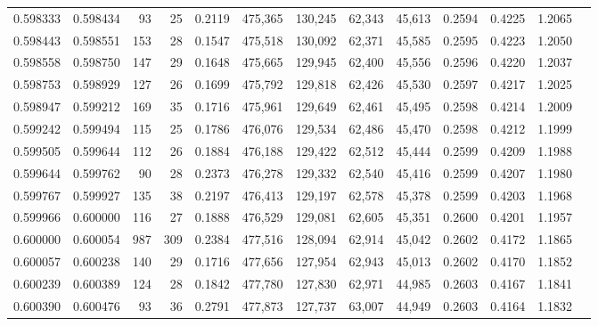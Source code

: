 \begin{tabular}{rrrrrrrrrrrrr}
0.598333 & 0.598434 &     93 &    25 &                                     0.2119 & 475,365 & 130,245 &  62,343 &  45,613 & 0.2594 & 0.4225 & 1.2065 \\
0.598443 & 0.598551 &    153 &    28 &                                     0.1547 & 475,518 & 130,092 &  62,371 &  45,585 & 0.2595 & 0.4223 & 1.2050 \\
0.598558 & 0.598750 &    147 &    29 &                                     0.1648 & 475,665 & 129,945 &  62,400 &  45,556 & 0.2596 & 0.4220 & 1.2037 \\
0.598753 & 0.598929 &    127 &    26 &                                     0.1699 & 475,792 & 129,818 &  62,426 &  45,530 & 0.2597 & 0.4217 & 1.2025 \\
0.598947 & 0.599212 &    169 &    35 &                                     0.1716 & 475,961 & 129,649 &  62,461 &  45,495 & 0.2598 & 0.4214 & 1.2009 \\
0.599242 & 0.599494 &    115 &    25 &                                     0.1786 & 476,076 & 129,534 &  62,486 &  45,470 & 0.2598 & 0.4212 & 1.1999 \\
0.599505 & 0.599644 &    112 &    26 &                                     0.1884 & 476,188 & 129,422 &  62,512 &  45,444 & 0.2599 & 0.4209 & 1.1988 \\
0.599644 & 0.599762 &     90 &    28 &                                     0.2373 & 476,278 & 129,332 &  62,540 &  45,416 & 0.2599 & 0.4207 & 1.1980 \\
0.599767 & 0.599927 &    135 &    38 &                                     0.2197 & 476,413 & 129,197 &  62,578 &  45,378 & 0.2599 & 0.4203 & 1.1968 \\
0.599966 & 0.600000 &    116 &    27 &                                     0.1888 & 476,529 & 129,081 &  62,605 &  45,351 & 0.2600 & 0.4201 & 1.1957 \\
0.600000 & 0.600054 &    987 &   309 &                                     0.2384 & 477,516 & 128,094 &  62,914 &  45,042 & 0.2602 & 0.4172 & 1.1865 \\
0.600057 & 0.600238 &    140 &    29 &                                     0.1716 & 477,656 & 127,954 &  62,943 &  45,013 & 0.2602 & 0.4170 & 1.1852 \\
0.600239 & 0.600389 &    124 &    28 &                                     0.1842 & 477,780 & 127,830 &  62,971 &  44,985 & 0.2603 & 0.4167 & 1.1841 \\
0.600390 & 0.600476 &     93 &    36 &                                     0.2791 & 477,873 & 127,737 &  63,007 &  44,949 & 0.2603 & 0.4164 & 1.1832 \\

\end{tabular}
